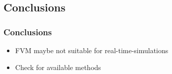 \subsection{Conclusions}

\begin{frame}[<+(1)->]
\frametitle{Conclusions}

\begin{itemize}
\item FVM maybe not suitable for real-time-simulations
\item Check for available methods
\end{itemize}

\end{frame}
